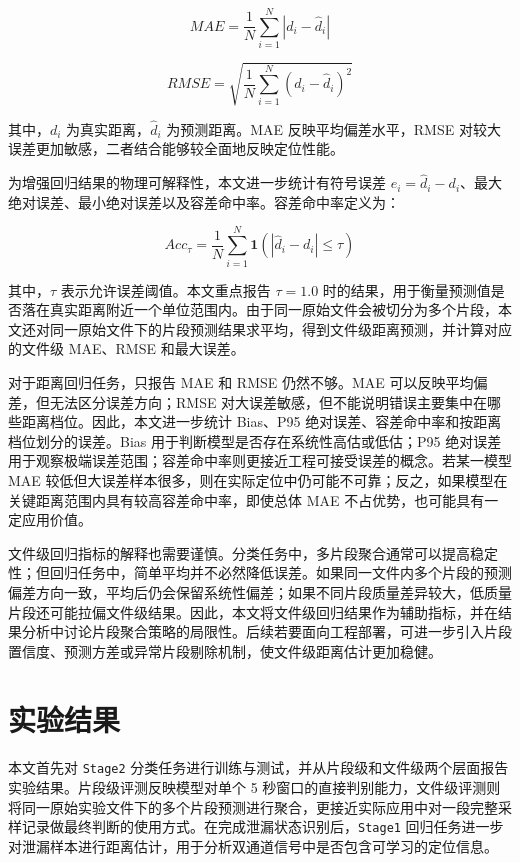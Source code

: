 \begin{equation}
MAE = \frac{1}{N}\sum_{i=1}^{N}|d_i-\hat{d}_i|
\end{equation}

\begin{equation}
RMSE = \sqrt{\frac{1}{N}\sum_{i=1}^{N}(d_i-\hat{d}_i)^2}
\end{equation}

其中，$d_i$ 为真实距离，$\hat{d}_i$ 为预测距离。MAE 反映平均偏差水平，RMSE 对较大误差更加敏感，二者结合能够较全面地反映定位性能。

为增强回归结果的物理可解释性，本文进一步统计有符号误差 $e_i=\hat{d}_i-d_i$、最大绝对误差、最小绝对误差以及容差命中率。容差命中率定义为：

\begin{equation}
Acc_{\tau} = \frac{1}{N}\sum_{i=1}^{N}\mathbf{1}(|\hat{d}_i-d_i|\leq \tau)
\end{equation}

其中，$\tau$ 表示允许误差阈值。本文重点报告 $\tau=1.0$ 时的结果，用于衡量预测值是否落在真实距离附近一个单位范围内。由于同一原始文件会被切分为多个片段，本文还对同一原始文件下的片段预测结果求平均，得到文件级距离预测，并计算对应的文件级 MAE、RMSE 和最大误差。

对于距离回归任务，只报告 MAE 和 RMSE 仍然不够。MAE 可以反映平均偏差，但无法区分误差方向；RMSE 对大误差敏感，但不能说明错误主要集中在哪些距离档位。因此，本文进一步统计 Bias、P95 绝对误差、容差命中率和按距离档位划分的误差。Bias 用于判断模型是否存在系统性高估或低估；P95 绝对误差用于观察极端误差范围；容差命中率则更接近工程可接受误差的概念。若某一模型 MAE 较低但大误差样本很多，则在实际定位中仍可能不可靠；反之，如果模型在关键距离范围内具有较高容差命中率，即使总体 MAE 不占优势，也可能具有一定应用价值。

文件级回归指标的解释也需要谨慎。分类任务中，多片段聚合通常可以提高稳定性；但回归任务中，简单平均并不必然降低误差。如果同一文件内多个片段的预测偏差方向一致，平均后仍会保留系统性偏差；如果不同片段质量差异较大，低质量片段还可能拉偏文件级结果。因此，本文将文件级回归结果作为辅助指标，并在结果分析中讨论片段聚合策略的局限性。后续若要面向工程部署，可进一步引入片段置信度、预测方差或异常片段剔除机制，使文件级距离估计更加稳健。


\section{实验结果}

本文首先对 \texttt{Stage2} 分类任务进行训练与测试，并从片段级和文件级两个层面报告实验结果。片段级评测反映模型对单个 5 秒窗口的直接判别能力，文件级评测则将同一原始实验文件下的多个片段预测进行聚合，更接近实际应用中对一段完整采样记录做最终判断的使用方式。在完成泄漏状态识别后，\texttt{Stage1} 回归任务进一步对泄漏样本进行距离估计，用于分析双通道信号中是否包含可学习的定位信息。


